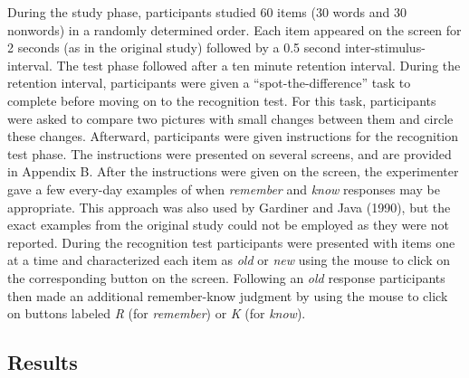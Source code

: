 \documentclass[english,,man]{apa6}
\begin{document}
During the study phase, participants studied 60 items (30 words and 30 nonwords) in a randomly determined order. Each item appeared on the screen for 2 seconds (as in the original study) followed by a 0.5 second inter-stimulus-interval. The test phase followed after a ten minute retention interval. During the retention interval, participants were given a \enquote{spot-the-difference} task to complete before moving on to the recognition test. For this task, participants were asked to compare two pictures with small changes between them and circle these changes.
Afterward, participants were given instructions for the recognition test phase. The instructions were presented on several screens, and are provided in Appendix B. After the instructions were given on the screen, the experimenter gave a few every-day examples of when \emph{remember} and \emph{know} responses may be appropriate. This approach was also used by Gardiner and Java (1990), but the exact examples from the original study could not be employed as they were not reported. During the recognition test participants were presented with items one at a time and characterized each item as \emph{old} or \emph{new} using the mouse to click on the corresponding button on the screen. Following an \emph{old} response participants then made an additional remember-know judgment by using the mouse to click on buttons labeled \emph{R} (for \emph{remember}) or \emph{K} (for \emph{know}).

\hypertarget{results}{%
\subsection{Results}\label{results}}
\end{document}
